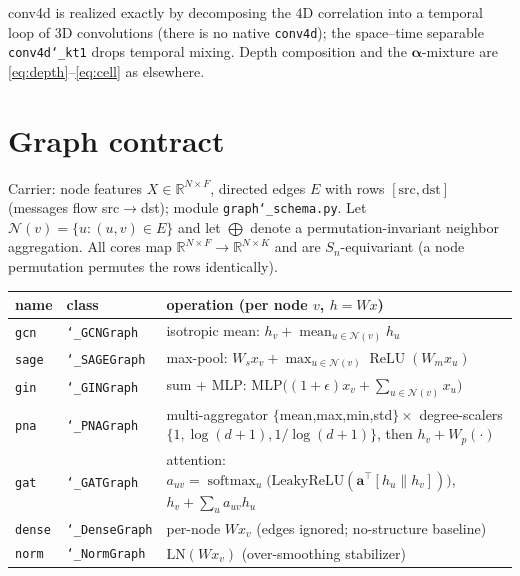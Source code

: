 \documentclass[11pt]{article}
\newcommand{\allowbreakhere}{\discretionary{}{}{}}
\newcommand{\code}[1]{\texttt{\def\_{\char`_\allowbreakhere}#1}}
\newcommand{\R}{\mathbb{R}}
\newcommand{\alphapar}{\bm{\alpha}}
\newcommand{\softmax}{\operatorname{softmax}}
\newcommand{\relu}{\operatorname{ReLU}}
\newcommand{\Sn}{S_n}
\begin{document}
\noindent conv4d is realized exactly by decomposing the 4D correlation into a temporal loop of 3D
convolutions (there is no native \code{conv4d}); the space--time separable \code{conv4d\_kt1} drops temporal
mixing. Depth composition and the $\alphapar$-mixture are \eqref{eq:depth}--\eqref{eq:cell} as elsewhere.

\section{Graph contract}
\label{sec:graph}

Carrier: node features $X\in\R^{N\times F}$, directed edges $E$ with rows $[\text{src},\text{dst}]$ (messages
flow src$\to$dst); module \code{graph\_schema.py}. Let $\mathcal{N}(v)=\{u:(u,v)\in E\}$ and let
$\bigoplus$ denote a permutation-invariant neighbor aggregation. All cores map $\R^{N\times F}\!\to\!\R^{N\times K}$
and are $\Sn$-equivariant (a node permutation permutes the rows identically).

\begin{center}
\footnotesize
\renewcommand{\arraystretch}{1.4}
\begin{tabular}{@{}p{1.5cm}p{2.0cm}p{9.5cm}@{}}
\toprule
name & class & operation (per node $v$, $h=Wx$)\\
\midrule
\code{gcn}  & \code{\_GCNGraph}  & isotropic mean: $h_v+\operatorname{mean}_{u\in\mathcal N(v)}h_u$~\cite{kipf2017gcn}\\
\code{sage} & \code{\_SAGEGraph} & max-pool: $W_s x_v + \max_{u\in\mathcal N(v)}\relu(W_m x_u)$~\cite{hamilton2017graphsage}\\
\code{gin}  & \code{\_GINGraph}  & sum + MLP: $\mathrm{MLP}\big((1{+}\epsilon)x_v+\sum_{u\in\mathcal N(v)}x_u\big)$~\cite{xu2019gin}\\
\code{pna}  & \code{\_PNAGraph}  & multi-aggregator $\{$mean,max,min,std$\}\times$ degree-scalers $\{1,\log(d{+}1),1/\log(d{+}1)\}$, then $h_v+W_{\!p}(\cdot)$~\cite{corso2020pna}\\
\code{gat}  & \code{\_GATGraph}  & attention: $a_{uv}=\softmax_u\!\big(\mathrm{LeakyReLU}(\bm a^\top[h_u\|h_v])\big)$, $h_v+\sum_u a_{uv}h_u$~\cite{velickovic2018gat}\\
\code{dense}& \code{\_DenseGraph}& per-node $Wx_v$ (edges ignored; no-structure baseline)\\
\code{norm} & \code{\_NormGraph} & $\mathrm{LN}(Wx_v)$ (over-smoothing stabilizer)\\
\bottomrule
\end{tabular}
\end{center}
\end{document}
